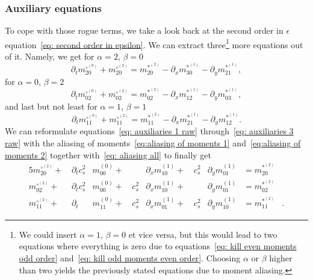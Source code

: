 \subsubsection{Auxiliary equations}
\label{subs:Auxiliary equations}
To cope with those rogue terms, we take a look back at the second order in $\epsilon$ equation~\eqref{eq: second order in epsilon}.
We can extract three\footnote{We could insert $\alpha=1$, $\beta=0$ et vice versa, but this would lead to two equations where everything is zero due to equations~\eqref{eq: kill even moments odd order} and~\eqref{eq: kill odd moments even order}.
Choosing $\alpha$ or $\beta$ higher than two yields the previously stated equations due to moment aliasing.} more equations out of it.
Namely, we get for $\alpha=2$, $\beta=0$
\begin{equation}
  \label{eq: auxiliaries 1 raw}
  \partial_t m_{20}^{\circ^{(0)}} + m_{20}^{\circ^{(2)}} =  m_{20}^{*^{(2)}} - \partial_x m_{30}^{*^{(1)}} - \partial_y m_{21}^{*^{(1)}},
\end{equation}
for $\alpha=0$, $\beta=2$
\begin{equation}
  \label{eq: auxiliaries 2 raw}
  \partial_t m_{02}^{\circ^{(0)}} + m_{02}^{\circ^{(2)}} =  m_{02}^{*^{(2)}} - \partial_x m_{12}^{*^{(1)}} - \partial_y m_{03}^{*^{(1)}},
\end{equation}
and last but not least for $\alpha=1$, $\beta=1$
\begin{equation}
  \label{eq: auxiliaries 3 raw}
  \partial_t m_{11}^{\circ^{(0)}} + m_{11}^{\circ^{(2)}} =  m_{11}^{*^{(2)}} - \partial_x m_{21}^{*^{(1)}} - \partial_y m_{12}^{*^{(1)}}.
\end{equation}
We can reformulate equations~\eqref{eq: auxiliaries 1 raw} through~\eqref{eq: auxiliaries 3 raw} with the aliasing of moments~\eqref{eq:aliasing of moments 1}
and~\eqref{eq:aliasing of moments 2} together with~\eqref{eq: aliasing all} to finally get
\begin{alignat}{5}
  \label{eq: auxiliaries 1}
  m_{20}^{\circ^{(2)}} +&\, \partial_t c_s^2& m_{00}^{(0)} +&\, &\partial_x m_{10}^{(1)} +&\, c_s^2&\partial_y m_{01}^{(1)} &=  m_{20}^{*^{(2)}}&
  \\
  \label{eq: auxiliaries 2}
  m_{02}^{\circ^{(2)}} +&\, \partial_t c_s^2& m_{00}^{(0)} +&\, c_s^2&\partial_x m_{10}^{(1)} +&\, &\partial_y m_{01}^{(1)} &=  m_{02}^{*^{(2)}}&
  \\
  \label{eq: auxiliaries 3}
  m_{11}^{\circ^{(2)}} +&\, \partial_t &m_{11}^{(0)} +&\, c_s^2&\partial_x m_{01}^{(1)} +&\, c_s^2&\partial_y m_{10}^{(1)} &=  m_{11}^{*^{(2)}}&.
\end{alignat}
